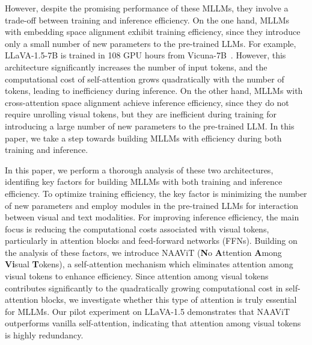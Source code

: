 However, despite the promising performance of these MLLMs, they involve a trade-off between training and inference efficiency.
On the one hand, MLLMs with embedding space alignment exhibit training efficiency, since they introduce only a small number of new parameters to the pre-trained LLMs.
For example, LLaVA-1.5-7B is trained in 108 GPU hours from Vicuna-7B~\cite{vicuna}.
However, this architecture significantly increases the number of input tokens, and the computational cost of self-attention grows quadratically with the number of tokens, leading to inefficiency during inference.
On the other hand, MLLMs with cross-attention space alignment achieve inference efficiency, since they do not require unrolling visual tokens, but they are inefficient during training for introducing a large number of new parameters to the pre-trained LLM.
In this paper, we take a step towards building MLLMs with efficiency during both training and inference.

In this paper, we perform a thorough analysis of these two architectures, identifing key factors for building MLLMs with both training and inference efficiency.
To optimize training efficiency, the key factor is minimizing the number of new parameters and employ modules in the pre-trained LLMs for interaction between visual and text modalities.
For improving inference efficiency, the main focus is reducing the computational costs associated with visual tokens, particularly in attention blocks and feed-forward networks (FFNs).
Building on the analysis of these factors, we introduce NAAViT (\textbf{N}o \textbf{A}ttention \textbf{A}mong \textbf{Vi}sual \textbf{T}okens), a self-attention mechanism which eliminates attention among visual tokens to enhance efficiency.
Since attention among visual tokens contributes significantly to the quadratically growing computational cost in self-attention blocks, we investigate whether this type of attention is truly essential for MLLMs.
Our pilot experiment on LLaVA-1.5 demonstrates that NAAViT outperforms vanilla self-attention, indicating that attention among visual tokens is highly redundancy.

